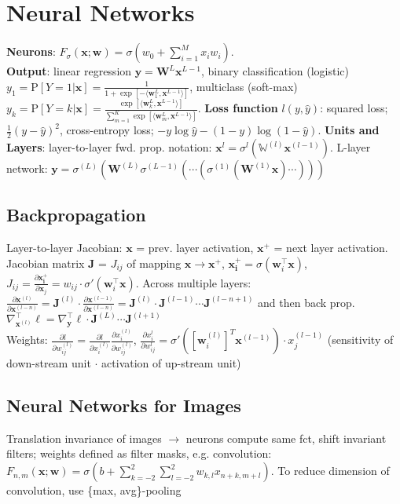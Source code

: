\section{Neural Networks}
\textbf{Neurons}: $F_\sigma(\mathbf{x};\mathbf{w}) = \sigma(w_0 + \sum_{i=1}^M{x_iw_i})$.\\ \textbf{Output}: linear regression $\mathbf{y} = \mathbf{W}^L\mathbf{x}^{L-1}$, binary classification (logistic) $y_1 = \text{P}[Y=1|\mathbf{x}] = \frac{1}{1 + \exp[-\langle \mathbf{w}_1^L,\mathbf{x}^{L-1}\rangle]}$, multiclass (soft-max) $y_k = \text{P}[Y=k|\mathbf{x}]= \frac{\exp[\langle \mathbf{w}_k^L,\mathbf{x}^{L-1}\rangle]}{\sum_{m=1}^{K}{\exp[\langle \mathbf{w}_m^L, \mathbf{x}^{L-1}\rangle]}}$. \textbf{Loss function} $l(y, \hat{y})$: squared loss; $\frac{1}{2}(y - \hat{y})^2$, cross-entropy loss; $-y \log \hat{y} - (1-y)\log(1-\hat{y})$. \textbf{Units and Layers}: layer-to-layer fwd. prop. notation: $\mathbf{x}^{l} = \sigma^{l}\left(\mathbb{W}^{\left(l\right)}\mathbf{x}^{\left(l-1\right)}\right)$. L-layer network: $\mathbf{y}=\sigma^{\left(L\right)}\left(\mathbf{W}^(L)\sigma^{(L-1)}\left(\cdots\left(\sigma^{(1)}\left(\mathbf{W}^{(1)}\mathbf{x}\right)\cdots\right)\right)\right)$

\subsection*{Backpropagation}
Layer-to-layer Jacobian: $\mathbf{x}$ = prev. layer activation, $\mathbf{x^+}$ = next layer activation. Jacobian matrix $\mathbf{J}$ = $J_{ij}$ of mapping $\mathbf{x}\rightarrow\mathbf{x^+}$, $\mathbf{x_i^+} = \sigma(\mathbf{w}_i^\top\mathbf{x})$, $J_{ij} = \frac{\partial \mathbf{x_i^+}}{\partial \mathbf{x}_j} = w_{ij}\cdot\sigma'(\mathbf{w}_i^\top\mathbf{x})$. Across multiple layers: $\frac{\partial\mathbf{x}^{(l)}}{\partial\mathbf{x}^{(l-n)}} = \mathbf{J}^{(l)}\cdot\frac{\partial\mathbf{x}^{(l-1)}}{\partial\mathbf{x}^{(l-n)}}=\mathbf{J}^{(l)}\cdot\mathbf{J}^{(l-1)}\cdots\mathbf{J}^{(l-n+1)}$ and then back prop. $ \nabla_{\mathbf{x}^{(l)}}^\top\ell=\nabla_{\mathbf{y}}^\top\ell\cdot\mathbf{J}^{(L)}\cdots\mathbf{J}^{(l+1)}$\\
Weights: $\frac{\partial l}{\partial w_{ij}^{(l)}} = \frac{\partial l}{\partial x_i^{(l)}}\frac{\partial x_i^{(l)}}{\partial w_{ij}^{(l)}}$, $\frac{\partial x_i^{l}}{\partial w_{ij}^{l}} = \sigma'([\mathbf{w}_i^{(l)}]^T \mathbf{x}^{(l-1)})\cdot x_j^{(l-1)}$ (sensitivity of down-stream unit $\cdot$ activation of up-stream unit)


\subsection*{Neural Networks for Images}
Translation invariance of images $\rightarrow$ neurons compute same fct, shift invariant filters; weights defined as filter masks, e.g. convolution: $F_{n,m}(\mathbf{x};\mathbf{w}) = \sigma(b + \sum_{k=-2}^2\sum_{l=-2}^{2}{w_{k,l}x_{n+k,m+l}})$. To reduce dimension of convolution, use \{max, avg\}-pooling